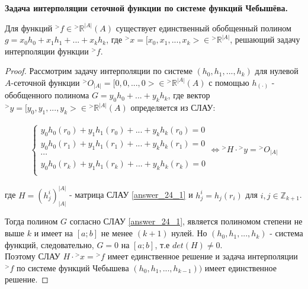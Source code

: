 \documentclass[__main__.tex]{subfiles}
\begin{document}
\textbf{Задача интерполяции сеточной функции по системе функций Чебышёва.}

\begin{theorem}
Для функций ${}^{>}f \in {}^{>}\mathbb{R}^{|A|}(A)$ существует единственный обобщенный полином $g = x_0 h_0 + x_1 h_1 + \text{...} + x_k h_k$, где ${}^{>}x = [x_0, x_1, \text{...}, x_k > \in {}^{>}\mathbb{R}^{|A|}$, решающий задачу интерполяции функции ${}^{>} f$.
\end{theorem}

\begin{proof}
Рассмотрим задачу интерполяции по системе $(h_0, h_1, \text{...}, h_k)$ для нулевой $A$-сеточной функции ${}^{>}O_{|A|} = [0, 0, \text{...}, 0> \in {}^{>}\mathbb{R}^{|A|}(A)$ с помощью $h_{(\cdot)}$ - обобщенного полинома $G = y_0 h_0 + \text{...} + y_k h_k$, где вектор ${}^{>} y = [y_0, y_1, \text{...}, y_k> \in {}^{>}\mathbb{R}^{|A|}(A)$ определяется из СЛАУ:

\begin{gather}
\begin{cases}
y_0 h_0(r_0) + y_1 h_1 (r_0) + \text{...} + y_k h_k(r_0) = 0\\
y_0 h_0(r_1) + y_1 h_1 (r_1) + \text{...} + y_k h_k(r_1) = 0\\
\cdots\\
y_0 h_0(r_k) + y_1 h_1 (r_k) + \text{...} + y_k h_k(r_k) = 0\\
\end{cases}
\Leftrightarrow
{}^{>}H \cdot {}^{>} y = {}^{>} O_{|A|}
\label{answer_24_1}
\end{gather}

где $H = (h_j^i)_{|A|}^{|A|}$ - матрица СЛАУ \ref{answer_24_1} и $h_j^i = h_j(r_i)$ для $i, j \in \mathbb{Z}_{k + 1}$.

Тогда полином $G$ согласно СЛАУ \ref{answer_24_1}, является полиномом степени не выше $k$ и имеет на $[a; b]$ не менее $(k + 1)$ нулей. Но $(h_0, h_1, \text{...}, h_k)$ - система функций, следовательно, $G = 0$ на $[a; b]$, т.е $det(H) \neq 0$.\\

Поэтому СЛАУ $H \cdot {}^{>}x = {}^{>}f$ имеет единственное решение и задача интерполяции ${}^{>}f$ по системе функций Чебышева $(h_0, h_1, \text{...}, h_{k - 1}))$ имеет единственное решение.
\end{proof}
\end{document}
